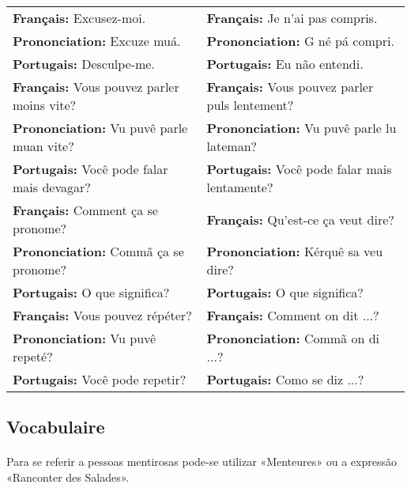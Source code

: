 \documentclass{article}
\begin{document}
            \begin{center}
                \begin{tabular}{m{8cm} m{8cm}}
                    \textbf{Français:}      Excusez-moi. & \textbf{Français:}      Je n'ai pas compris.\\
                    \textbf{Prononciation:} Excuze muá.  & \textbf{Prononciation:} G né pá compri.\\
                    \textbf{Portugais:}     Desculpe-me. & \textbf{Portugais:}     Eu não entendi.\\[2.5ex]

                    \textbf{Français:}      Vous pouvez parler moins vite? & \textbf{Français:}      Vous pouvez parler puls lentement?\\
                    \textbf{Prononciation:} Vu puvê parle muan vite?       & \textbf{Prononciation:} Vu puvê parle lu lateman?\\
                    \textbf{Portugais:}     Você pode falar mais devagar?  & \textbf{Portugais:}     Você pode falar mais lentamente?\\[2.5ex] 
                    
                    \textbf{Français:}      Comment ça se pronome? & \textbf{Français:}      Qu'est-ce ça veut dire?\\
                    \textbf{Prononciation:} Commã ça se pronome?   & \textbf{Prononciation:} Kérquê sa veu dire?\\
                    \textbf{Portugais:}     O que significa?       & \textbf{Portugais:}     O que significa?\\[2.5ex]

                    \textbf{Français:}      Vous pouvez répéter? & \textbf{Français:}      Comment on dit ...?\\
                    \textbf{Prononciation:} Vu puvê repeté?      & \textbf{Prononciation:} Commã on di ...?\\
                    \textbf{Portugais:}     Você pode repetir?   & \textbf{Portugais:}     Como se diz ...?\\
                \end{tabular}
            \end{center}

    \subsection{Vocabulaire}
        \paragraph{}Para se referir a pessoas mentirosas pode-se utilizar «Menteures» ou a expressão «Ranconter des Salades».
        
\end{document}
